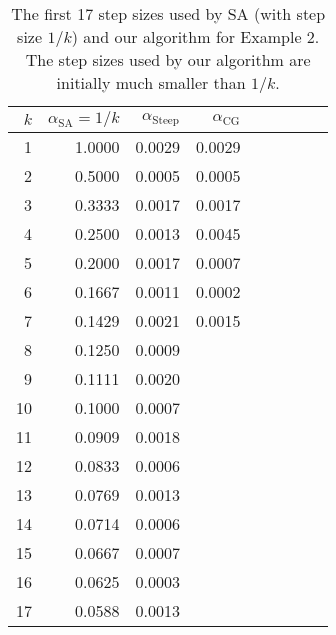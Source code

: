 \documentclass[oneside]{myumnStatThesis}
\begin{document}
\begin{table}
\caption{The first 17 step sizes used by SA (with step size $1/k$) and our algorithm for Example 2.  The step sizes 
used by our algorithm are initially much smaller than $1/k$.
}
\begin{center}
\begin{tabular}{rrrrrrrrr}
  \hline
  $k$ & $\alpha_{\textrm{SA}} =1/k$  & $\alpha_{\textrm{Steep}}$ & $\alpha_{\textrm{CG}}$ \\ 
  \hline
1	&	1.0000	&	0.0029	&	0.0029	\\
2	&	0.5000	&	0.0005	&	0.0005	\\
3	&	0.3333	&	0.0017	&	0.0017	\\
4	&	0.2500	&	0.0013	&	0.0045	\\
5	&	0.2000	&	0.0017	&	0.0007	\\
6	&	0.1667	&	0.0011	&	0.0002	\\
7	&	0.1429	&	0.0021	&	0.0015	\\
8	&	0.1250	&	0.0009	&		\\
9	&	0.1111	&	0.0020	&		\\
10	&	0.1000	&	0.0007	&		\\
11	&	0.0909	&	0.0018	&		\\
12	&	0.0833	&	0.0006	&		\\
13	&	0.0769	&	0.0013	&		\\
14	&	0.0714	&	0.0006	&		\\
15	&	0.0667	&	0.0007	&		\\
16	&	0.0625	&	0.0003	&		\\
17	&	0.0588	&	0.0013	&		\\
  \hline
\end{tabular}
\end{center}
\label{Table:Potts step size}
\end{table}
\end{document}
